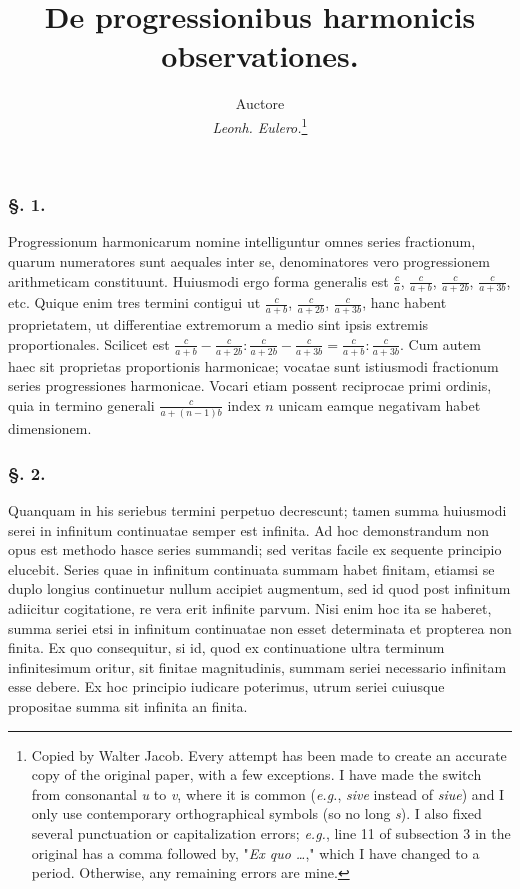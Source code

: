 \documentclass[12pt, letterpaper]{article}
\begin{document}
\title{De progressionibus harmonicis observationes.}
\author{Auctore \\ \emph{Leonh. Eulero.}\footnote{
        Copied by Walter Jacob.
        Every attempt has been made to create an accurate copy of the original
        paper, with a few exceptions. I have made the switch from consonantal
        \emph{u} to \emph{v}, where it is common (\emph{e.g.}, \emph{sive}
        instead of \emph{siue}) and I only use contemporary orthographical
        symbols (so no long \emph{s}). I also fixed several punctuation or
        capitalization errors; \emph{e.g.}, line 11 of subsection 3 in the
        original has a comma followed by, "\emph{Ex quo \dots}," which I
        have changed to a period. Otherwise, any remaining errors are mine.
    }}
\date{}
\maketitle

\subsubsection*{\S. 1.}
Progressionum harmonicarum nomine intelliguntur
omnes series fractionum, quarum numeratores sunt
aequales inter se, denominatores vero progressionem
arithmeticam constituunt. Huiusmodi ergo
forma generalis est
$\frac{c}{a}$, $\frac{c}{a+b}$, $\frac{c}{a+2b}$, $\frac{c}{a+3b}$, etc.
Quique enim tres termini contigui ut
$\frac{c}{a+b}$, $\frac{c}{a+2b}$, $\frac{c}{a+3b}$, hanc
habent proprietatem, ut differentiae extremorum a medio
sint ipsis extremis proportionales. Scilicet est
$\frac{c}{a+b} - \frac{c}{a+2b} : \frac{c}{a+2b} - \frac{c}{a+3b} = \frac{c}{a+b} : \frac{c}{a+3b}.$
Cum autem haec sit
proprietas proportionis harmonicae; vocatae sunt istiusmodi
fractionum series progressiones harmonicae. Vocari
etiam possent reciprocae primi ordinis, quia in termino
generali $\frac{c}{a+(n-1)b}$ index $n$ unicam eamque negativam
habet dimensionem.

\subsubsection*{\S. 2.}
Quanquam in his seriebus termini perpetuo decrescunt; tamen summa huiusmodi
serei in infinitum continuatae semper est infinita.
Ad hoc demonstrandum non opus est methodo hasce series summandi; sed veritas
facile ex sequente principio elucebit.
Series quae in infinitum continuata summam habet finitam, etiamsi se duplo
longius continuetur nullum accipiet augmentum, sed id quod post infinitum
adiicitur cogitatione, re vera erit infinite parvum.
Nisi enim hoc ita se haberet, summa seriei etsi in infinitum continuatae
non esset determinata et propterea non finita.
Ex quo consequitur, si id, quod ex continuatione ultra terminum infinitesimum
oritur, sit finitae magnitudinis, summam seriei necessario infinitam esse
debere.
Ex hoc principio iudicare poterimus, utrum seriei cuiusque propositae summa
sit infinita an finita.
\end{document}
